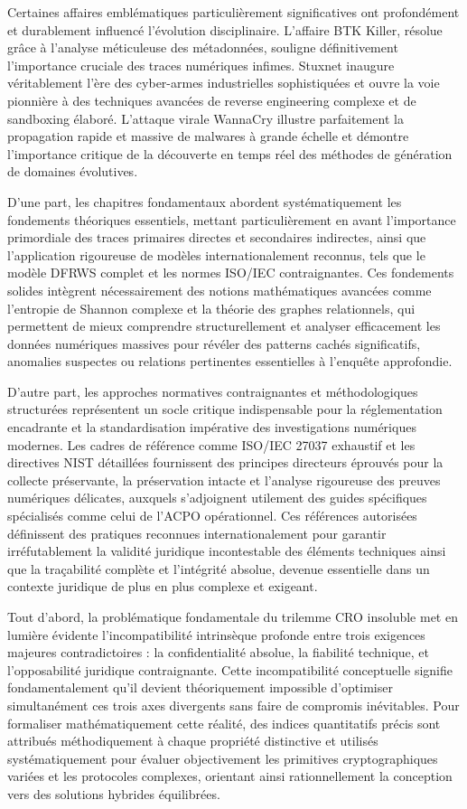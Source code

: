 \documentclass[12pt, a4paper]{article}
\begin{document}
	Certaines affaires emblématiques particulièrement significatives ont profondément et durablement influencé l'évolution disciplinaire. L'affaire BTK Killer, résolue grâce à l'analyse méticuleuse des métadonnées, souligne définitivement l'importance cruciale des traces numériques infimes. Stuxnet inaugure véritablement l'ère des cyber-armes industrielles sophistiquées et ouvre la voie pionnière à des techniques avancées de reverse engineering complexe et de sandboxing élaboré. L'attaque virale WannaCry illustre parfaitement la propagation rapide et massive de malwares à grande échelle et démontre l'importance critique de la découverte en temps réel des méthodes de génération de domaines évolutives.
	
	\medskip
	D'une part, les chapitres fondamentaux abordent systématiquement les fondements théoriques essentiels, mettant particulièrement en avant l'importance primordiale des traces primaires directes et secondaires indirectes, ainsi que l'application rigoureuse de modèles internationalement reconnus, tels que le modèle DFRWS complet et les normes ISO/IEC contraignantes. Ces fondements solides intègrent nécessairement des notions mathématiques avancées comme l'entropie de Shannon complexe et la théorie des graphes relationnels, qui permettent de mieux comprendre structurellement et analyser efficacement les données numériques massives pour révéler des patterns cachés significatifs, anomalies suspectes ou relations pertinentes essentielles à l'enquête approfondie.
	
	D'autre part, les approches normatives contraignantes et méthodologiques structurées représentent un socle critique indispensable pour la réglementation encadrante et la standardisation impérative des investigations numériques modernes. Les cadres de référence comme ISO/IEC 27037 exhaustif et les directives NIST détaillées fournissent des principes directeurs éprouvés pour la collecte préservante, la préservation intacte et l'analyse rigoureuse des preuves numériques délicates, auxquels s'adjoignent utilement des guides spécifiques spécialisés comme celui de l'ACPO opérationnel. Ces références autorisées définissent des pratiques reconnues internationalement pour garantir irréfutablement la validité juridique incontestable des éléments techniques ainsi que la traçabilité complète et l'intégrité absolue, devenue essentielle dans un contexte juridique de plus en plus complexe et exigeant.
	
	\medskip
	Tout d'abord, la problématique fondamentale du trilemme CRO insoluble met en lumière évidente l'incompatibilité intrinsèque profonde entre trois exigences majeures contradictoires : la confidentialité absolue, la fiabilité technique, et l'opposabilité juridique contraignante. Cette incompatibilité conceptuelle signifie fondamentalement qu'il devient théoriquement impossible d'optimiser simultanément ces trois axes divergents sans faire de compromis inévitables. Pour formaliser mathématiquement cette réalité, des indices quantitatifs précis sont attribués méthodiquement à chaque propriété distinctive et utilisés systématiquement pour évaluer objectivement les primitives cryptographiques variées et les protocoles complexes, orientant ainsi rationnellement la conception vers des solutions hybrides équilibrées.
	
\end{document}
